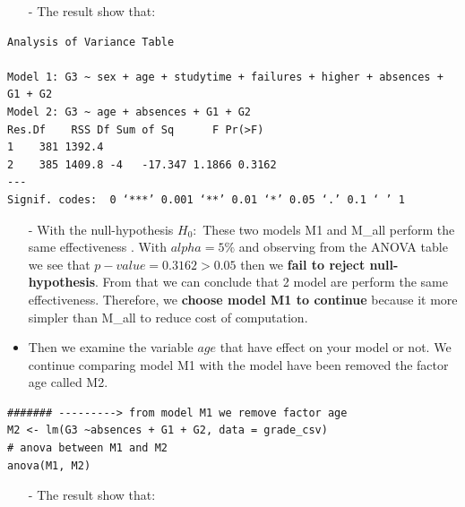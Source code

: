 \documentclass[a4paper]{article}
\numberwithin{equation}{section}
\begin{document}
\begin{itemize}
  \item [-] The result show that:
\end{itemize}

\begin{mdframed}[leftline=false,rightline=false,backgroundcolor=magenta!10,nobreak=true]
  \begin{verbatim}
Analysis of Variance Table

Model 1: G3 ~ sex + age + studytime + failures + higher + absences + G1 + G2
Model 2: G3 ~ age + absences + G1 + G2
Res.Df    RSS Df Sum of Sq      F Pr(>F)
1    381 1392.4
2    385 1409.8 -4   -17.347 1.1866 0.3162
---
Signif. codes:  0 ‘***’ 0.001 ‘**’ 0.01 ‘*’ 0.05 ‘.’ 0.1 ‘ ’ 1
  \end{verbatim}
\end{mdframed}

\begin{itemize}
  \item[-] With the null-hypothesis \(H_0:\) These two models M1 and M\_all perform the same effectiveness . With \(alpha = 5\%\) and observing from the ANOVA table we see that \(p-value = 0.3162 > 0.05\) then we \textbf{fail to reject null-hypothesis}. From that we can conclude that 2 model are perform the same effectiveness. Therefore, we \textbf{choose model M1 to continue} because it more simpler than M\_all to reduce cost of computation.
\end{itemize}

\begin{itemize}
  \item Then we examine the variable \(age\) that have effect on your model or not. We continue comparing model M1 with the model have been removed the factor age called M2.
\end{itemize}

\begin{mdframed}[leftline=false,rightline=false,backgroundcolor=magenta!10,nobreak=true]
  \begin{verbatim}
####### ---------> from model M1 we remove factor age
M2 <- lm(G3 ~absences + G1 + G2, data = grade_csv)
# anova between M1 and M2
anova(M1, M2)
  \end{verbatim}
\end{mdframed}

\begin{itemize}
  \item [-] The result show that:
\end{itemize}
\end{document}
